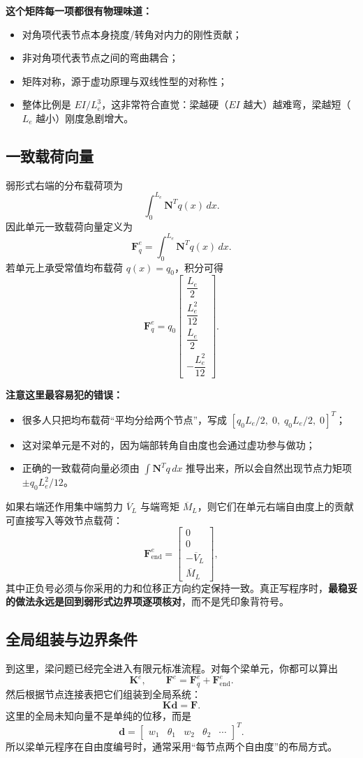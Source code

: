 \documentclass[11pt, a4paper, UTF8]{ctexart}
\begin{document}
\textbf{这个矩阵每一项都很有物理味道：}
\begin{itemize}
    \item 对角项代表节点本身挠度/转角对内力的刚性贡献；
    \item 非对角项代表节点之间的弯曲耦合；
    \item 矩阵对称，源于虚功原理与双线性型的对称性；
    \item 整体比例是 $EI/L_e^3$，这非常符合直觉：梁越硬（$EI$ 越大）越难弯，梁越短（$L_e$ 越小）刚度急剧增大。
\end{itemize}

\subsection{一致载荷向量}
弱形式右端的分布载荷项为
\[
\int_0^{L_e} \bm{N}^T q(x)\, dx.
\]
因此单元一致载荷向量定义为
\[
\bm{F}^e_q = \int_0^{L_e} \bm{N}^T q(x)\, dx.
\]
若单元上承受常值均布载荷 $q(x)=q_0$，积分可得
\[
\bm{F}^e_q
=
q_0
\begin{bmatrix}
\dfrac{L_e}{2} \\
\dfrac{L_e^2}{12} \\
\dfrac{L_e}{2} \\
-\dfrac{L_e^2}{12}
\end{bmatrix}.
\]

\textbf{注意这里最容易犯的错误：}
\begin{itemize}
    \item 很多人只把均布载荷“平均分给两个节点”，写成 $\left[q_0L_e/2,\;0,\;q_0L_e/2,\;0\right]^T$；
    \item 这对梁单元是不对的，因为端部转角自由度也会通过虚功参与做功；
    \item 正确的一致载荷向量必须由 $\int \bm{N}^T q\, dx$ 推导出来，所以会自然出现节点力矩项 $\pm q_0L_e^2/12$。
\end{itemize}

如果右端还作用集中端剪力 $\overline{V}_L$ 与端弯矩 $\overline{M}_L$，则它们在单元右端自由度上的贡献可直接写入等效节点载荷：
\[
\bm{F}^e_{\text{end}} =
\begin{bmatrix}
0 \\ 0 \\ -\overline{V}_L \\ \overline{M}_L
\end{bmatrix},
\]
其中正负号必须与你采用的力和位移正方向约定保持一致。真正写程序时，\textbf{最稳妥的做法永远是回到弱形式边界项逐项核对}，而不是凭印象背符号。

\subsection{全局组装与边界条件}
到这里，梁问题已经完全进入有限元标准流程。对每个梁单元，你都可以算出
\[
\bm{K}^e, \qquad \bm{F}^e = \bm{F}^e_q + \bm{F}^e_{\text{end}}.
\]
然后根据节点连接表把它们组装到全局系统：
\[
\bm{K}\bm{d} = \bm{F}.
\]
这里的全局未知向量不是单纯的位移，而是
\[
\bm{d} =
\begin{bmatrix}
w_1 & \theta_1 & w_2 & \theta_2 & \cdots
\end{bmatrix}^T.
\]
所以梁单元程序在自由度编号时，通常采用“每节点两个自由度”的布局方式。
\end{document}

